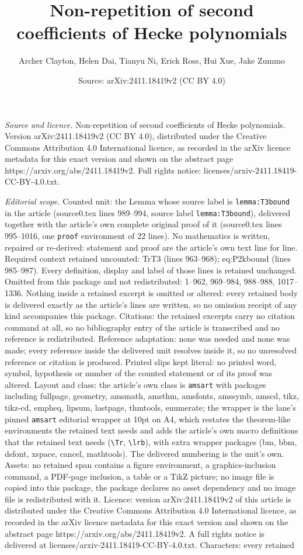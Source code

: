 \documentclass[10pt,a4paper]{amsart}
\title[Non-repetition of second coefficients of Hecke polynomials]{Non-repetition of second coefficients of Hecke polynomials}
\author{Archer Clayton, Helen Dai, Tianyu Ni, Erick Ross, Hui Xue, Jake Zummo}
\date{Source: arXiv:2411.18419v2 (CC BY 4.0)}
\begin{document}
\maketitle

\noindent\emph{Source and licence.} Non-repetition of second coefficients of Hecke polynomials. Version arXiv:2411.18419v2 (CC BY 4.0), distributed under the Creative Commons Attribution 4.0 International licence, as recorded in the arXiv licence metadata for this exact version and shown on the abstract page https://arxiv.org/abs/2411.18419v2. Full rights notice: licenses/arxiv-2411.18419-CC-BY-4.0.txt.\par\smallskip

\noindent\textit{Editorial scope.} Counted unit: the Lemma whose source label is \texttt{lemma:T3bound} in the article (source0.tex lines 989--994, source label \texttt{lemma:T3bound}), delivered together with the article's own complete original proof of it (source0.tex lines 995--1016, one \texttt{proof} environment of 22 lines). No mathematics is written, repaired or re-derived: statement and proof are the article's own text line for line. Required context retained uncounted: TrT3 (lines 963--968); eq:P2kbound (lines 985--987). Every definition, display and label of those lines is retained unchanged. Omitted from this package and not redistributed: 1--962, 969--984, 988--988, 1017--1336. Nothing inside a retained excerpt is omitted or altered: every retained body is delivered exactly as the article's lines are written, so no omission receipt of any kind accompanies this package. Citations: the retained excerpts carry no citation command at all, so no bibliography entry of the article is transcribed and no reference is redistributed. Reference adaptation: none was needed and none was made; every reference inside the delivered unit resolves inside it, so no unresolved reference or citation is produced. Printed slips kept literal: no printed word, symbol, hypothesis or number of the counted statement or of its proof was altered. Layout and class: the article's own class is \texttt{amsart} with packages including fullpage, geometry, amsmath, amsthm, amsfonts, amssymb, amscd, tikz, tikz-cd, empheq, lipsum, lastpage, thmtools, enumerate; the wrapper is the lane's pinned \texttt{amsart} editorial wrapper at 10pt on A4, which restates the theorem-like environments the retained text needs and adds the article's own macro definitions that the retained text needs (\texttt{\textbackslash Tr}, \texttt{\textbackslash lrb}), with extra wrapper packages (bm, bbm, dsfont, xspace, cancel, mathtools). The delivered numbering is the unit's own. Assets: no retained span contains a figure environment, a graphics-inclusion command, a PDF-page inclusion, a table or a TikZ picture; no image file is copied into this package, the package declares no asset dependency and no image file is redistributed with it. Licence: version arXiv:2411.18419v2 of this article is distributed under the Creative Commons Attribution 4.0 International licence, as recorded in the arXiv licence metadata for this exact version and shown on the abstract page https://arxiv.org/abs/2411.18419v2. A full rights notice is delivered at licenses/arxiv-2411.18419-CC-BY-4.0.txt. Characters: every retained 
\end{document}
